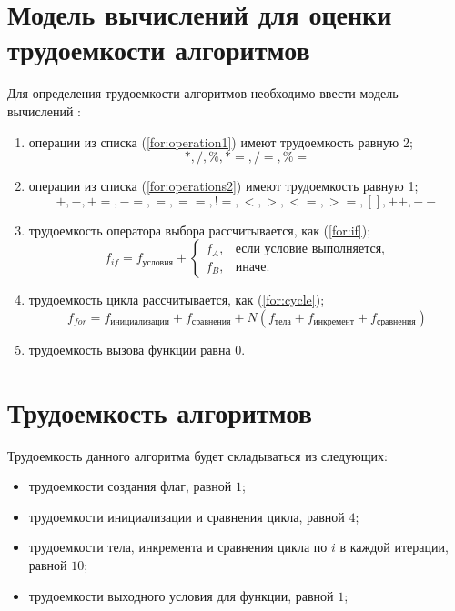 \section{Модель вычислений для оценки трудоемкости алгоритмов}

Для определения трудоемкости алгоритмов необходимо ввести модель вычислений \cite{alg1}:

\begin{enumerate}
	\item операции из списка (\ref{for:operation1}) имеют трудоемкость равную 2;
	\begin{equation}
		\label{for:operation1}
		*, /, \%, *=, /=, \%=
	\end{equation}
	\item операции из списка (\ref{for:operations2}) имеют трудоемкость равную 1;
	\begin{equation}
		\label{for:operations2}
		+, -, +=, -=, =, ==, !=, <, >, <=, >=, [], ++, {-}-
	\end{equation}
	\item трудоемкость оператора выбора  рассчитывается, как (\ref{for:if});
	\begin{equation}
		\label{for:if}
		f_{if} = f_{\text{условия}} +
		\begin{cases}
			f_A, & \text{если условие выполняется,}\\
			f_B, & \text{иначе.}
		\end{cases}
	\end{equation}
	\item трудоемкость цикла рассчитывается, как (\ref{for:cycle});
	\begin{equation}
		\label{for:cycle}
		f_{for} = f_{\text{инициализации}} + f_{\text{сравнения}} + N(f_{\text{тела}} + f_{\text{инкремент}} + f_{\text{сравнения}})
	\end{equation}
	\item трудоемкость вызова функции равна 0.
\end{enumerate}
\clearpage
\section{Трудоемкость алгоритмов}

Трудоемкость данного алгоритма будет складываться из следующих:

\begin{itemize}
	\item трудоемкости создания флаг, равной $1$;
	\item трудоемкости инициализации и сравнения цикла, равной $4$;
	\item трудоемкости тела, инкремента и сравнения цикла по $i$ в каждой итерации, равной $10$;
	\item трудоемкости выходного условия для функции, равной $1$;
\end{itemize}

